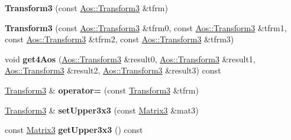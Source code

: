 \begin{DoxyCompactItemize}
\item 
\hypertarget{classVectormath_1_1Soa_1_1Transform3_aa7487f322952ccdba2dff476e55d939a}{{\bfseries Transform3} (const \hyperlink{classVectormath_1_1Aos_1_1Transform3}{Aos\-::\-Transform3} \&tfrm)}\label{classVectormath_1_1Soa_1_1Transform3_aa7487f322952ccdba2dff476e55d939a}

\item 
\hypertarget{classVectormath_1_1Soa_1_1Transform3_a998f5d5a93356096912a73dd77d5d629}{{\bfseries Transform3} (const \hyperlink{classVectormath_1_1Aos_1_1Transform3}{Aos\-::\-Transform3} \&tfrm0, const \hyperlink{classVectormath_1_1Aos_1_1Transform3}{Aos\-::\-Transform3} \&tfrm1, const \hyperlink{classVectormath_1_1Aos_1_1Transform3}{Aos\-::\-Transform3} \&tfrm2, const \hyperlink{classVectormath_1_1Aos_1_1Transform3}{Aos\-::\-Transform3} \&tfrm3)}\label{classVectormath_1_1Soa_1_1Transform3_a998f5d5a93356096912a73dd77d5d629}

\item 
\hypertarget{classVectormath_1_1Soa_1_1Transform3_aa1838e8674952efec5726087ddd17f70}{void {\bfseries get4\-Aos} (\hyperlink{classVectormath_1_1Aos_1_1Transform3}{Aos\-::\-Transform3} \&result0, \hyperlink{classVectormath_1_1Aos_1_1Transform3}{Aos\-::\-Transform3} \&result1, \hyperlink{classVectormath_1_1Aos_1_1Transform3}{Aos\-::\-Transform3} \&result2, \hyperlink{classVectormath_1_1Aos_1_1Transform3}{Aos\-::\-Transform3} \&result3) const }\label{classVectormath_1_1Soa_1_1Transform3_aa1838e8674952efec5726087ddd17f70}

\item 
\hypertarget{classVectormath_1_1Soa_1_1Transform3_a3085b0d378d603ce81c0ff54684ff4fc}{\hyperlink{classVectormath_1_1Soa_1_1Transform3}{Transform3} \& {\bfseries operator=} (const \hyperlink{classVectormath_1_1Soa_1_1Transform3}{Transform3} \&tfrm)}\label{classVectormath_1_1Soa_1_1Transform3_a3085b0d378d603ce81c0ff54684ff4fc}

\item 
\hypertarget{classVectormath_1_1Soa_1_1Transform3_ace72360ba74e11546b4cacdee429cd42}{\hyperlink{classVectormath_1_1Soa_1_1Transform3}{Transform3} \& {\bfseries set\-Upper3x3} (const \hyperlink{classVectormath_1_1Soa_1_1Matrix3}{Matrix3} \&mat3)}\label{classVectormath_1_1Soa_1_1Transform3_ace72360ba74e11546b4cacdee429cd42}

\item 
\hypertarget{classVectormath_1_1Soa_1_1Transform3_a948a949f195fd507faba02d31618ae34}{const \hyperlink{classVectormath_1_1Soa_1_1Matrix3}{Matrix3} {\bfseries get\-Upper3x3} () const }\label{classVectormath_1_1Soa_1_1Transform3_a948a949f195fd507faba02d31618ae34}


\end{DoxyCompactItemize}
